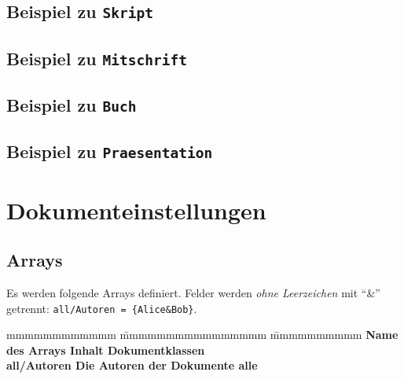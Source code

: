 		
		\begin{center}
			\vspace*{20em}
			\subsection{Beispiel zu \tt Skript}
		\end{center}
		\newpage
		
		\begin{center}
			\vspace*{20em}
			\subsection{Beispiel zu \tt Mitschrift}
		\end{center}
		\newpage
		
		\begin{center}
			\vspace*{20em}
			\subsection{Beispiel zu \tt Buch}
		\end{center}
		\newpage
		
		\begin{center}
			\vspace*{20em}
			\subsection{Beispiel zu \tt Praesentation}
		\end{center}
		\newpage


	
	\section{Dokumenteinstellungen}
		\subsection{Arrays}
			Es werden folgende Arrays definiert. Felder werden \emph{ohne Leerzeichen} mit "`\&"' getrennt: \verb|all/Autoren = {Alice&Bob}|.
			\begin{tabbing}
				mmmmmmmmmmmm 		\= mmmmmmmmmmmmmmmm				\=	mmmmmmmmmm	\kill
				\bf Name des Arrays	\> \bf Inhalt 					\> \bf Dokumentklassen\\
				 all/Autoren		\> Die Autoren der Dokumente	\> alle
			\end{tabbing}
